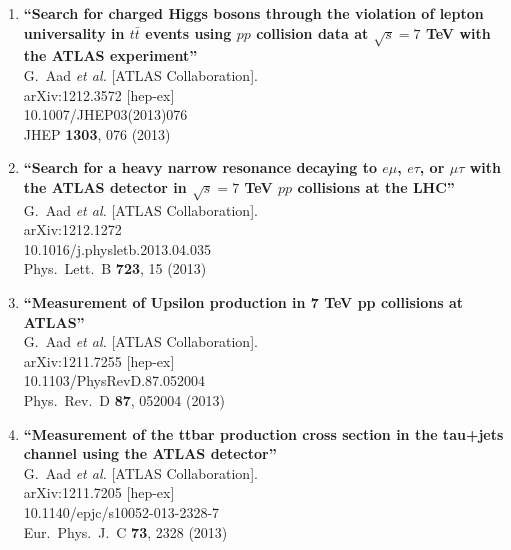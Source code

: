 \documentclass{article}
\begin{document}
\begin{enumerate}
\item%
{\bf ``Search for charged Higgs bosons through the violation of lepton universality in $t\bar{t}$ events using $pp$ collision data at $\sqrt{s}=7$ TeV with the ATLAS experiment''}
  \\{}G.~Aad {\it et al.}  [ATLAS Collaboration].
  \\{}arXiv:1212.3572 [hep-ex]
    \\{}10.1007/JHEP03(2013)076
\\{}JHEP {\bf 1303}, 076 (2013) %


\item%
{\bf ``Search for a heavy narrow resonance decaying to $e \mu$, $e \tau$, or $\mu \tau$ with the ATLAS detector in $\sqrt{s}=7$ TeV $pp$ collisions at the LHC''}
  \\{}G.~Aad {\it et al.}  [ATLAS Collaboration].
  \\{}arXiv:1212.1272
    \\{}10.1016/j.physletb.2013.04.035
\\{}Phys.\ Lett.\ B {\bf 723}, 15 (2013) %


\item%
{\bf ``Measurement of Upsilon production in 7 TeV pp collisions at ATLAS''}
  \\{}G.~Aad {\it et al.}  [ATLAS Collaboration].
  \\{}arXiv:1211.7255 [hep-ex]
    \\{}10.1103/PhysRevD.87.052004
\\{}Phys.\ Rev.\ D {\bf 87}, 052004 (2013) %


\item%
{\bf ``Measurement of the ttbar production cross section in the tau+jets channel using the ATLAS detector''}
  \\{}G.~Aad {\it et al.}  [ATLAS Collaboration].
  \\{}arXiv:1211.7205 [hep-ex]
    \\{}10.1140/epjc/s10052-013-2328-7
\\{}Eur.\ Phys.\ J.\ C {\bf 73}, 2328 (2013) %



\end{enumerate}
\end{document}
